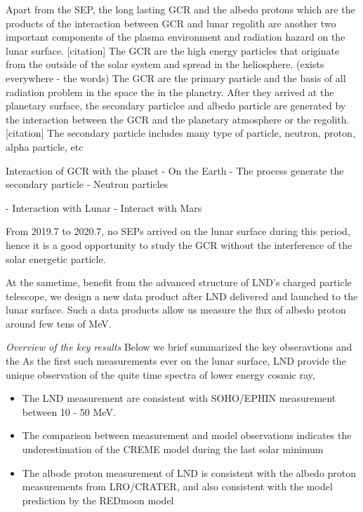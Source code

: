 Apart from the \acs{SEP}, the long lasting \ac{GCR} and the albedo protons which are the products of the interaction between \ac{GCR} and lunar regolith are another two important components of the plasma environment and radiation hazard on the lunar surface. [citation]
The GCR are the high energy particles that originate from the outside of the solar system and spread in the heliosphere. (exists everywhere - the words)
The \ac{GCR} are the primary particle and the basis of all radiation problem in the space the in the planetry.
After they  arrived at the planetary surface, the secondary particlce and albedo particle are generated by the interaction between the \ac{GCR} and the planetary atmosphere or the regolith.  [citation]
The secondary particle includes many type of particle, neutron, proton, alpha particle, etc

Interaction of GCR with the planet
- On the Earth 
    - The process generate the secondary particle
    - Neutron particles	
    
    
- Interaction with Lunar
- Interact with Mars 




From 2019.7 to 2020.7, no SEPs arrived on the lunar surface during this period, hence it is a good opportunity to study the \acs{GCR} without the interference of the solar energetic particle.

At the sametime, benefit from the advanced structure of \ac{LND}'s charged particle telescope, we design a new data product after LND delivered and launched to the lunar surface. Such a data products allow us measure the flux of albedo proton around few tens of MeV.

\textit{Overview of the key results}
Below we brief summarized the key obseravtions and the 
As the first such measurements ever on the lunar surface, LND provide the unique observation of the quite time spectra of lower energy cosmic ray, 

\begin{itemize}
    \item The LND measurement are consistent with SOHO/EPHIN measurement between 10 - 50 MeV. 
    \item The comparison between measurement and model observations indicates the underestimation of the CREME model during the last solar minimum
    \item The albode proton measurement of LND is consistent with the albedo proton measurements from LRO/CRATER, and also consistent with the model prediction by the REDmoon model
\end{itemize}



